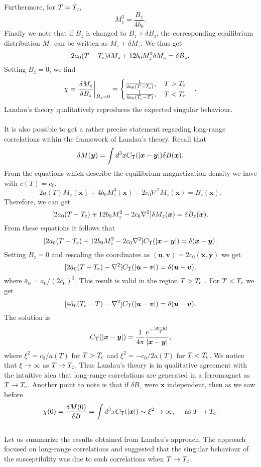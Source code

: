 Furthermore, for $T = T_{\rm c}$,
\[M_z^3 = \frac{B_z}{4b_0}.\]
Finally we note that if $B_z$ is changed to $B_z + \delta B_z$, the corresponding equilibrium distribution $M_z$ can be written as $M_z + \delta M_z$. We thus get
\[2a_0(T-T_{\rm c})\delta M_z + 12b_0M_z^2\delta M_z = \delta B_z.\]
Setting $B_z = 0$, we find
\[\chi = \left. \frac{\delta M_z}{\delta B_z} \right|_{B_z = 0} = \begin{cases} \frac{1}{2a_0(T-T_{\rm c})} , \quad T>T_{\rm c} \\ \frac{1}{4a_0(T_{\rm c}-T)} , \quad T<T_{\rm c} \end{cases} .\]
Landau's theory qualitatively reproduces the expected singular behaviour.
\\ \\
It is also possible to get a rather precise statement regarding long-range correlations within the framework of Landau's theory. Recall that
\[\delta M(\bm{y}) = \int d^3x C_{\rm T}(|\bm{x}-\bm{y}|)\delta B(\bm{x}).\]
From the equations which describe the equilibrium magnetization density we have with $c(T) = c_0$,
\[2a(T)M_z(\bm{x}) + 4b_0M_z^3(\bm{x})- 2c_0\nabla^2M_z(\bm{x}) = B_z(\bm{x}).\]
Therefore, we can get
\[[2a_0(T-T_{\rm c}) + 12b_0M_z^2 - 2c_0\nabla^2] \delta M_z(\bm{x}) = \delta B_z(\bm{x}).\]
From these equations it follows that
\[[2a_0(T-T_{\rm c}) + 12b_0M_z^2 - 2c_0\nabla^2]C_{\rm T}(|\bm{x} - \bm{y}|) = \delta(\bm{x} - \bm{y}) .\]
Setting $B_z = 0$ and rescaling the coordinates as $(\bm{u},\bm{v}) = 2c_0(\bm{x},\bm{y})$ we get
\[[2\bar{a}_0(T-T_{\rm c}) - \nabla^2] C_{\rm T}(|\bm{u} - \bm{v}|) = \delta(\bm{u} - \bm{v}),\]
where $\bar{a}_0 = a_0/(2c_0)^3$.
This result is valid in the region $T > T_{\rm c}$ . For $T < T_{\rm c}$ we get
\[[4\bar{a}_0(T_{\rm c}-T) - \nabla^2] C_{\rm T}(|\bm{u} - \bm{v}|) = \delta(\bm{u} - \bm{v}).\]
The solution is
\[C_{\rm T}(|\bm{x} - \bm{y}|) = \frac{1}{4\pi} \frac{e^{-\frac{|\bm{x} - \bm{y}|}{\xi}}}{|\bm{x} - \bm{y}|},\]
where $\xi^2 = c_0/a(T)$ for $T > T_{\rm c}$ and $\xi^2 = -c_0/2a(T)$ for $T < T_{\rm c}$.
We notice that $\xi \to \infty$ as $T \to T_{\rm c}$. Thus Landau's theory is in qualitative agreement with the intuitive idea that long-range correlations are generated in a ferromagnet as $T \to T_{\rm c}$.
Another point to note is that if $\delta B_z$ were $\bm{x}$ independent, then as we saw before
\[\chi(0) = \frac{\delta M(0)}{\delta B} = \int d^3x C_{\rm T}(|\bm{x}|) \sim \xi^2 \to \infty , \quad \mbox{ as } T \to T_{\rm c}.\]
\\
Let us summarize the results obtained from Landau's approach. The approach focused on long-range correlations and suggested that the singular behaviour of the susceptibility was due to such correlations when $T \to T_{\rm c}$. 

